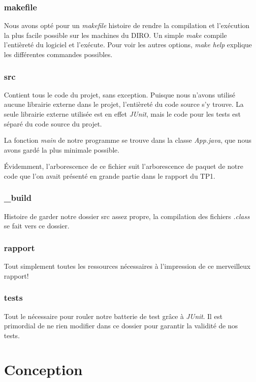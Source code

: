 \documentclass[letter,french]{report}
\begin{document}
	\subsubsection*{makefile}
	Nous avons opté pour un \emph{makefile} histoire de rendre la compilation et l'exécution
	la plus facile possible sur les machines du DIRO. Un simple \emph{make} compile
	l'entièreté du logiciel et l'exécute. Pour voir les autres options, \emph{make help}
	explique les différentes commandes possibles.

	\subsubsection*{src}
  Contient tous le code du projet, sans exception. Puisque nous n'avons utilisé
  aucune librairie externe dans le projet, l'entièreté du code source s'y trouve.
  La seule librairie externe utilisée est en effet \emph{JUnit}, mais le code
  pour les tests est séparé du code source du projet.

  La fonction \emph{main} de notre programme se trouve dans la classe
  \emph{App.java}, que nous avons gardé la plus minimale possible.

  Évidemment, l'arborescence de ce fichier suit l'arborescence de paquet de
  notre code que l'on avait présenté en grande partie dans le rapport du TP1.

	\subsubsection*{\_build}
  Histoire de garder notre dossier src assez propre, la compilation des fichiers
  \emph{.class} se fait vers ce dossier.

	\subsubsection*{rapport}
  Tout simplement toutes les ressources nécessaires à l'impression de ce
  merveilleux rapport!

  \subsubsection*{tests}
  Tout le nécessaire pour rouler notre batterie de test grâce à \emph{JUnit}. Il
  est primordial de ne rien modifier dans ce dossier pour garantir la validité
  de nos tests.
	
	\section*{Conception}
\end{document}
